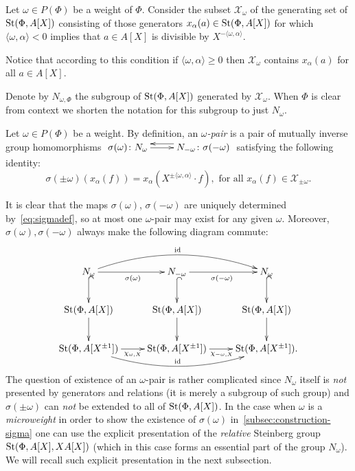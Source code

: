 Let $\omega \in P(\Phi)$ be a weight of $\Phi$.
Consider the subset $\mathcal{X}_\omega$ of the generating set of $\operatorname{St}(\Phi, A[X])$ consisting of those generators $x_{\alpha}(a) \in \operatorname{St}(\Phi, A[X])$ for which
$\langle \omega, \alpha\rangle < 0$ implies that $a \in A[X]$ is divisible by $X^{-\langle \omega, \alpha\rangle}$.
\begin{rem}
    Notice that according to this condition if $\langle \omega, \alpha\rangle \geq 0$ then $\mathcal{X}_\omega$ contains $x_\alpha(a)$ for all $a \in A[X]$.
\end{rem}
Denote by $N_{\omega, \Phi}$ the subgroup of $\operatorname{St}(\Phi, A[X])$ generated by $\mathcal{X}_\omega$.
When $\Phi$ is clear from context we shorten the notation for this subgroup to just $N_\omega$.

\begin{dfn} \label{dfn:delta-pair}
Let $\omega \in P(\Phi)$ be a weight.
By definition, an {\it $\omega$-pair} is a pair of mutually inverse group homomorphisms
$\xymatrix{ \sigma(\omega)\colon N_\omega \ar[r] & \ar@<-1.0ex>[l] N_{-\omega}\colon \sigma(-\omega) }$ satisfying the following identity:
\begin{equation} \label{eq:sigmadef}
\sigma(\pm \omega)(x_\alpha(f)) = x_\alpha(X^{\pm\langle\omega, \alpha\rangle}\cdot f),
\text{ for all } x_\alpha(f) \in \mathcal{X}_{\pm\omega}.
\end{equation}\end{dfn}
It is clear that the maps $\sigma(\omega)$, $\sigma(-\omega)$ are uniquely determined by~\eqref{eq:sigmadef}, so at most one $\omega$-pair may exist for any given $\omega$.
Moreover, $\sigma(\omega), \sigma(-\omega)$ always make the following diagram commute:
\begin{equation} \label{eq:sigma-diagram}
\xymatrix{ N_\omega \ar[r]_{\sigma(\omega)}\ar@{^{(}->}[d] \ar@/^1.5pc/[rr]^{\mathrm{id}} & N_{-\omega} \ar@{^{(}->}[d] \ar[r]_{\sigma(-\omega)} & N_\omega \ar@{^{(}->}[d] \\
\St(\Phi, A[X]) \ar[d] & \St(\Phi, A[X]) \ar[d] & \St(\Phi, A[X]) \ar[d] \\
\St(\Phi, A[X^{\pm 1}]) \ar@<-0.0ex>[r]_{\chi_{\omega, X}} \ar@/_1.5pc/[rr]^{\mathrm{id}} & \St(\Phi, A[X^{\pm 1}]) \ar@<-0.0ex>[r]_{\chi_{-\omega, X}} & \St(\Phi, A[X^{\pm 1}]).} \end{equation}
The question of existence of an $\omega$-pair is rather complicated since $N_\omega$ itself is \textit{not} presented by generators and relations
 (it is merely a subgroup of such group) and $\sigma(\pm \omega)$ can \textit{not} be extended to all of $\operatorname{St}(\Phi, A[X])$.
In the case when $\omega$ is a \textit{microweight} in order to show the existence of $\sigma(\omega)$ in~\cref{subsec:construction-sigma} one can use
 the explicit presentation of the \textit{relative} Steinberg group $\operatorname{St}(\Phi, A[X], XA[X])$
  (which in this case forms an essential part of the group $N_\omega$).
We will recall such explicit presentation in the next subsection.

